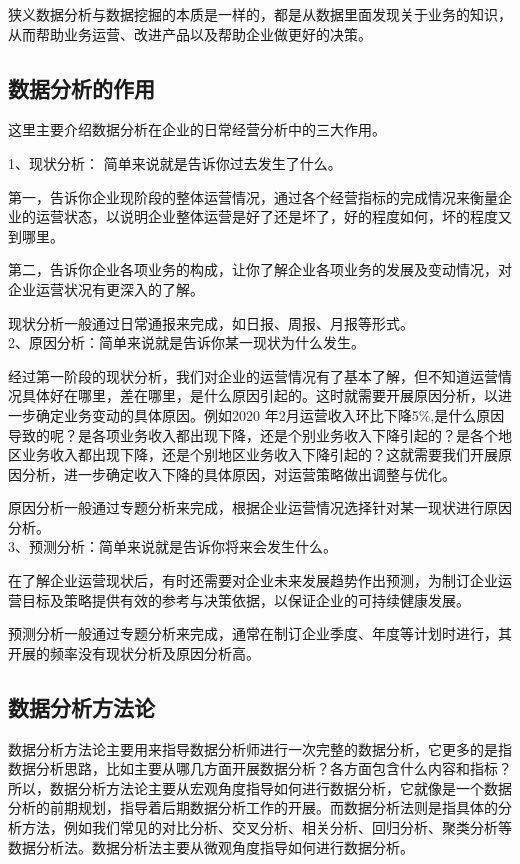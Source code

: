 狭义数据分析与数据挖掘的本质是一样的，都是从数据里面发现关于业务的知识，从而帮助业务运营、改进产品以及帮助企业做更好的决策。

\subsection{数据分析的作用}

这里主要介绍数据分析在企业的日常经营分析中的三大作用。

1、现状分析： 简单来说就是告诉你过去发生了什么。

第一，告诉你企业现阶段的整体运营情况，通过各个经营指标的完成情况来衡量企业的运营状态，以说明企业整体运营是好了还是坏了，好的程度如何，坏的程度又到哪里。

第二，告诉你企业各项业务的构成，让你了解企业各项业务的发展及变动情况，对企业运营状况有更深入的了解。

现状分析一般通过日常通报来完成，如日报、周报、月报等形式。\\

2、原因分析：简单来说就是告诉你某一现状为什么发生。

经过第一阶段的现状分析，我们对企业的运营情况有了基本了解，但不知道运营情况具体好在哪里，差在哪里，是什么原因引起的。这时就需要开展原因分析，以进一步确定业务变动的具体原因。例如2020 年2月运营收入环比下降5$\%$,是什么原因导致的呢？是各项业务收入都出现下降，还是个别业务收入下降引起的？是各个地区业务收入都出现下降，还是个别地区业务收入下降引起的？这就需要我们开展原因分析，进一步确定收入下降的具体原因，对运营策略做出调整与优化。

原因分析一般通过专题分析来完成，根据企业运营情况选择针对某一现状进行原因分析。\\

3、预测分析：简单来说就是告诉你将来会发生什么。

在了解企业运营现状后，有时还需要对企业未来发展趋势作出预测，为制订企业运营目标及策略提供有效的参考与决策依据，以保证企业的可持续健康发展。

预测分析一般通过专题分析来完成，通常在制订企业季度、年度等计划时进行，其开展的频率没有现状分析及原因分析高。

\subsection{数据分析方法论}

数据分析方法论主要用来指导数据分析师进行一次完整的数据分析，它更多的是指数据分析思路，比如主要从哪几方面开展数据分析？各方面包含什么内容和指标？
所以，数据分析方法论主要从宏观角度指导如何进行数据分析，它就像是一个数据分析的前期规划，指导着后期数据分析工作的开展。而数据分析法则是指具体的分析方法，例如我们常见的对比分析、交叉分析、相关分析、回归分析、聚类分析等数据分析法。数据分析法主要从微观角度指导如何进行数据分析。

